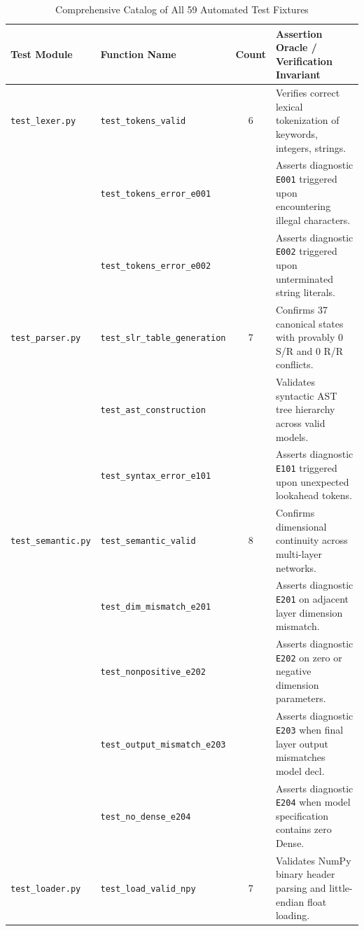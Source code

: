 \documentclass[11pt,a4paper]{article}
\begin{document}
\begin{table}[htbp]
\centering
\scriptsize
\caption{Comprehensive Catalog of All 59 Automated Test Fixtures}
\label{tab:complete_59_tests}
\begin{tabular}{llcp{7.2cm}}
\toprule
\textbf{Test Module} & \textbf{Function Name} & \textbf{Count} & \textbf{Assertion Oracle / Verification Invariant} \\
\midrule
\texttt{test\_lexer.py} & \texttt{test\_tokens\_valid} & 6 & Verifies correct lexical tokenization of keywords, integers, strings. \\
                        & \texttt{test\_tokens\_error\_e001} & & Asserts diagnostic \texttt{E001} triggered upon encountering illegal characters. \\
                        & \texttt{test\_tokens\_error\_e002} & & Asserts diagnostic \texttt{E002} triggered upon unterminated string literals. \\
\midrule
\texttt{test\_parser.py}& \texttt{test\_slr\_table\_generation} & 7 & Confirms 37 canonical states with provably 0 S/R and 0 R/R conflicts. \\
                        & \texttt{test\_ast\_construction} & & Validates syntactic AST tree hierarchy across valid models. \\
                        & \texttt{test\_syntax\_error\_e101} & & Asserts diagnostic \texttt{E101} triggered upon unexpected lookahead tokens. \\
\midrule
\texttt{test\_semantic.py}& \texttt{test\_semantic\_valid} & 8 & Confirms dimensional continuity across multi-layer networks. \\
                          & \texttt{test\_dim\_mismatch\_e201} & & Asserts diagnostic \texttt{E201} on adjacent layer dimension mismatch. \\
                          & \texttt{test\_nonpositive\_e202} & & Asserts diagnostic \texttt{E202} on zero or negative dimension parameters. \\
                          & \texttt{test\_output\_mismatch\_e203} & & Asserts diagnostic \texttt{E203} when final layer output mismatches model decl. \\
                          & \texttt{test\_no\_dense\_e204} & & Asserts diagnostic \texttt{E204} when model specification contains zero Dense. \\
\midrule
\texttt{test\_loader.py}  & \texttt{test\_load\_valid\_npy} & 7 & Validates NumPy binary header parsing and little-endian float loading. \\

\end{tabular}
\end{table}
\end{document}
